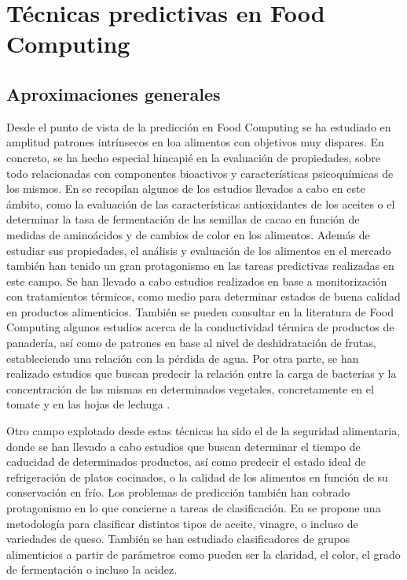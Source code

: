 \section{Técnicas predictivas en Food Computing}\label{sec_pred}

\subsection{Aproximaciones generales}

Desde el punto de vista de la predicción en Food Computing se ha estudiado en amplitud patrones intrínsecos en loa alimentos con objetivos muy dispares. En concreto, se ha hecho especial hincapié en la evaluación de propiedades, sobre todo relacionadas con componentes bioactivos y características psicoquímicas de los mismos. En \cite{Correa2018} se recopilan algunos de los estudios llevados a cabo en este ámbito, como la evaluación de las características antioxidantes de los aceites o el determinar la tasa de fermentación de las semillas de cacao en función de medidas de aminoácidos y de cambios de color en los alimentos. Además de estudiar sus propiedades, el análisis y evaluación de los alimentos en el mercado también han tenido un gran protagonismo en las tareas predictivas realizadas en este campo. Se han llevado a cabo estudios  realizados en base a monitorización con tratamientos térmicos, como medio para determinar estados de buena calidad en productos alimenticios. También se pueden consultar en la literatura de Food Computing algunos estudios acerca de la conductividad térmica de productos de panadería, así como de patrones en base al nivel de deshidratación de frutas, estableciendo una relación con la pérdida de agua. Por otra parte, se han realizado estudios que buscan predecir la relación entre la carga de bacterias y la concentración de las mismas en determinados vegetales, concretamente en el tomate y en las hojas de lechuga \cite{Correa2018}. 

Otro campo explotado desde estas técnicas ha sido el de la seguridad alimentaria, donde se han llevado a cabo estudios que buscan determinar el tiempo de caducidad de determinados productos, así como predecir el estado ideal de refrigeración de platos cocinados, o la calidad de los alimentos en función de su conservación en frío. Los problemas de predicción también han cobrado protagonismo en lo que concierne a tareas de clasificación. En \cite{Correa2018} se propone una metodología para clasificar distintos tipos de aceite, vinagre, o incluso de variedades de queso. También se han estudiado clasificadores de grupos alimenticios a partir de parámetros como pueden ser la claridad, el color, el grado de fermentación o incluso la acidez\cite{min2019survey}. 

